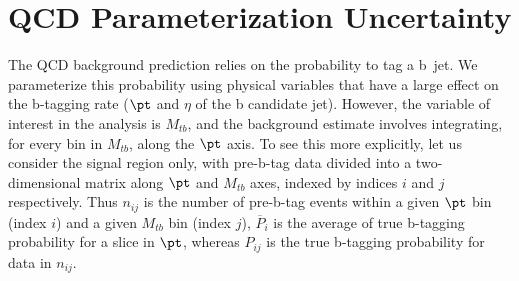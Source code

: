 







\clearpage

\section{QCD Parameterization Uncertainty}
\label{sec:qcdpunc}

The QCD background prediction relies on the probability to tag a b~jet.  
We parameterize this probability using physical variables that
have a large effect on the b-tagging rate ($\pt$ and $\eta$ of the b
candidate jet).  However, the variable of interest in the analysis
is $M_{tb}$, and the background estimate involves integrating, for
every bin in $M_{tb}$, along the $\pt$ axis.  To see this more
explicitly, let us consider the signal region only, with pre-b-tag
data divided into a two-dimensional matrix along $\pt$ and
$M_{tb}$ axes, indexed by indices $i$ and $j$ respectively.
Thus $n_{ij}$ is the number of pre-b-tag events within a given $\pt$
bin (index $i$) and a given $M_{tb}$ bin (index $j$), 
$\overline P_i$ is the average of true b-tagging probability for a slice 
in $\pt$, whereas $P_{ij}$ is the true b-tagging probability for
data in $n_{ij}$.

